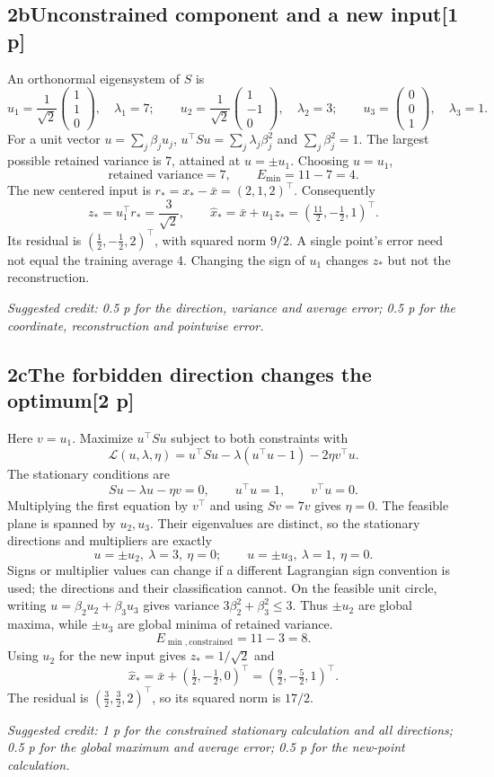 \documentclass[11pt,a4paper]{article}
\newcommand{\solution}[3]{\Needspace{6\baselineskip}\subsection*{\color{examblue}#1\quad #2\hfill\normalsize[#3 p]}}
\newcommand{\selfcredit}[1]{\par\textit{Suggested credit: #1}\par}
\begin{document}
\solution{2b}{Unconstrained component and a new input}{1}
An orthonormal eigensystem of $S$ is
\[
u_1=\frac1{\sqrt2}\begin{pmatrix}1\\1\\0\end{pmatrix},\quad \lambda_1=7;
\qquad u_2=\frac1{\sqrt2}\begin{pmatrix}1\\-1\\0\end{pmatrix},\quad \lambda_2=3;
\qquad u_3=\begin{pmatrix}0\\0\\1\end{pmatrix},\quad \lambda_3=1.
\]
For a unit vector $u=\sum_j\beta_ju_j$, $u^\top Su=\sum_j\lambda_j\beta_j^2$
and $\sum_j\beta_j^2=1$. The largest possible retained variance is 7,
attained at $u=\pm u_1$. Choosing $u=u_1$,
\[
\boxed{\text{retained variance}=7,\qquad E_{\min}=11-7=4}.
\]
The new centered input is $r_*=x_*-\bar x=(2,1,2)^\top$. Consequently
\[
z_*=u_1^\top r_*=\frac3{\sqrt2},\qquad
\widehat x_*=\bar x+u_1z_*=\boxed{(\tfrac{11}{2},-\tfrac12,1)^\top}.
\]
Its residual is $(\tfrac12,-\tfrac12,2)^\top$, with squared norm
$\boxed{9/2}$. A single point's error need not equal the training average 4.
Changing the sign of $u_1$ changes $z_*$ but not the reconstruction.
\selfcredit{0.5 p for the direction, variance and average error; 0.5 p for the coordinate, reconstruction and pointwise error.}

\solution{2c}{The forbidden direction changes the optimum}{2}
Here $v=u_1$. Maximize $u^\top Su$ subject to both constraints with
\[
\mathcal L(u,\lambda,\eta)=u^\top Su-\lambda(u^\top u-1)-2\eta v^\top u.
\]
The stationary conditions are
\[
Su-\lambda u-\eta v=0,\qquad u^\top u=1,\qquad v^\top u=0.
\]
Multiplying the first equation by $v^\top$ and using $Sv=7v$ gives
$\eta=0$. The feasible plane is spanned by $u_2,u_3$. Their eigenvalues are
distinct, so the stationary directions and multipliers are exactly
\[
\boxed{u=\pm u_2,\ \lambda=3,\ \eta=0;
\qquad u=\pm u_3,\ \lambda=1,\ \eta=0}.
\]
Signs or multiplier values can change if a different Lagrangian sign convention
is used; the directions and their classification cannot. On the feasible unit
circle, writing $u=\beta_2u_2+\beta_3u_3$ gives variance
$3\beta_2^2+\beta_3^2\leq3$. Thus $\pm u_2$ are global maxima, while
$\pm u_3$ are global minima of retained variance.
\[
\boxed{E_{\min,\mathrm{constrained}}=11-3=8}.
\]
Using $u_2$ for the new input gives $z_*=1/\sqrt2$ and
\[
\widehat x_*=\bar x+(\tfrac12,-\tfrac12,0)^\top
=\boxed{(\tfrac92,-\tfrac52,1)^\top}.
\]
The residual is $(\tfrac32,\tfrac32,2)^\top$, so its squared norm is
$\boxed{17/2}$.
\selfcredit{1 p for the constrained stationary calculation and all directions; 0.5 p for the global maximum and average error; 0.5 p for the new-point calculation.}
\end{document}
